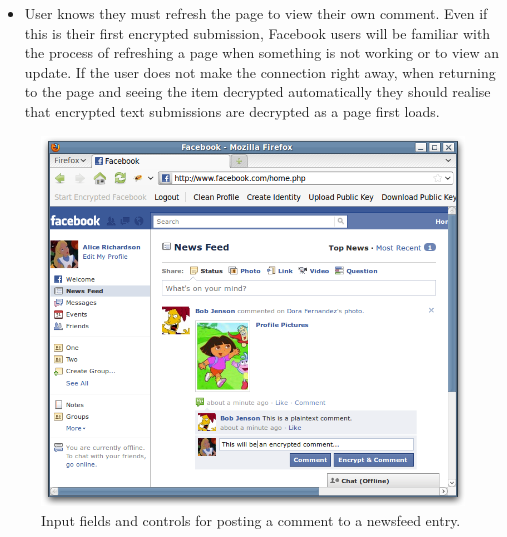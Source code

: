 \begin{desc}
\begin{itemize}
            \item User knows they must refresh the page to view their own comment. Even if this is their first encrypted submission, Facebook users will be familiar with the process of refreshing a page when something is not working or to view an update. If the user does not make the connection right away, when returning to the page and seeing the item decrypted automatically they should realise that encrypted text submissions are decrypted as a page first loads.
        
        \end{itemize}
\end{desc}


    \begin{figure}[tbph]
        \begin{center}
        
                \includegraphics[width=12cm]{screens/comment.png}

            \caption{Input fields and controls for posting a comment to a newsfeed entry.}
            \label{scn:comment}
        \end{center}
    \end{figure}























